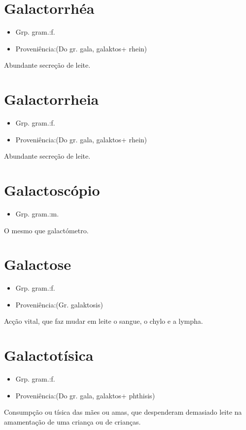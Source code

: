 \section{Galactorrhéa}
\begin{itemize}
\item {Grp. gram.:f.}
\end{itemize}
\begin{itemize}
\item {Proveniência:(Do gr. \textunderscore gala\textunderscore , \textunderscore galaktos\textunderscore  + \textunderscore rhein\textunderscore )}
\end{itemize}
Abundante secreção de leite.
\section{Galactorrheia}
\begin{itemize}
\item {Grp. gram.:f.}
\end{itemize}
\begin{itemize}
\item {Proveniência:(Do gr. \textunderscore gala\textunderscore , \textunderscore galaktos\textunderscore  + \textunderscore rhein\textunderscore )}
\end{itemize}
Abundante secreção de leite.
\section{Galactoscópio}
\begin{itemize}
\item {Grp. gram.:m.}
\end{itemize}
O mesmo que \textunderscore galactómetro\textunderscore .
\section{Galactose}
\begin{itemize}
\item {Grp. gram.:f.}
\end{itemize}
\begin{itemize}
\item {Proveniência:(Gr. \textunderscore galaktosis\textunderscore )}
\end{itemize}
Acção vital, que faz mudar em leite o sangue, o chylo e a lympha.
\section{Galactotísica}
\begin{itemize}
\item {Grp. gram.:f.}
\end{itemize}
\begin{itemize}
\item {Proveniência:(Do gr. \textunderscore gala\textunderscore , \textunderscore galaktos\textunderscore  + \textunderscore phthisis\textunderscore )}
\end{itemize}
Consumpção ou tísica das mães ou amas, que despenderam demasiado leite na amamentação de uma criança ou de crianças.

